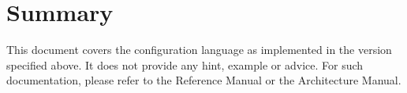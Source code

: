 
\chapter*{Summary}



This document covers the configuration language as implemented in the version
specified above. It does not provide any hint, example or advice. For such
documentation, please refer to the Reference Manual or the Architecture Manual.



